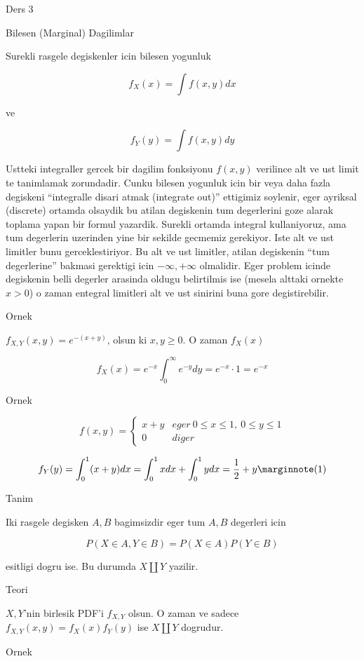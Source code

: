 \documentclass[12pt,fleqn]{article}\usepackage{../common}
\begin{document}
Ders 3

Bilesen (Marginal) Dagilimlar 

Surekli rasgele degiskenler icin bilesen yogunluk 

\[ f_X(x) = \int f(x,y) dx \]

ve

\[ f_Y(y) = \int f(x,y) dy \]


Ustteki integraller gercek bir dagilim fonksiyonu $f(x,y)$ verilince alt ve
ust limit te tanimlamak zorundadir. Cunku bilesen yogunluk icin bir veya
daha fazla degiskeni ``integralle disari atmak (integrate out)'' ettigimiz
soylenir, eger ayriksal (discrete) ortamda olsaydik bu atilan degiskenin
tum degerlerini goze alarak toplama yapan bir formul yazardik. Surekli
ortamda integral kullaniyoruz, ama tum degerlerin uzerinden yine bir
sekilde gecmemiz gerekiyor. Iste alt ve ust limitler bunu
gerceklestiriyor. Bu alt ve ust limitler, atilan degiskenin ``tum
degerlerine'' bakmasi gerektigi icin $-\infty,+\infty$ olmalidir. Eger
problem icinde degiskenin belli degerler arasinda oldugu belirtilmis ise
(mesela alttaki ornekte $x>0$) o zaman entegral limitleri alt ve ust
sinirini buna gore degistirebilir. 


Ornek 

$f_{X,Y}(x,y) = e^{ -(x+y)}$, olsun ki $x,y \ge 0$. O zaman $f_X(x)$

\[ f_X(x) = e^{ -x} \int _{ 0}^{\infty} e^{ -y}dy = e^{ -x}  \cdot 1  = e^{-x} 
\]

Ornek 

\[ f(x,y) = 
\left\{ \begin{array}{ll}
x+y & eger \ 0 \le x \le 1, \ 0 \le y \le 1 \\
0 & diger
\end{array} \right.
 \]

\[ f_Y(y) = \int _{0}^{1}(x+y) dx = 
\int _{0}^{1}x dx + \int _{0}^{1}y dx  = 
\frac{ 1}{2} + y 
\mlabel{1}
 \]

Tanim 

Iki rasgele degisken $A,B$ bagimsizdir eger tum $A,B$ degerleri icin 

\[ P(X \in A, Y \in B) = P(X \in A)P(Y \in B) \]

esitligi dogru ise. Bu durumda $X \amalg Y$ yazilir.

Teori 

$X,Y$'nin birlesik PDF'i $f_{X,Y}$ olsun. O zaman ve sadece 
$f_{X,Y}(x,y) =
 f_X(x)f_Y(y)$ ise $X \amalg Y$ dogrudur. 

Ornek 
\end{document}
